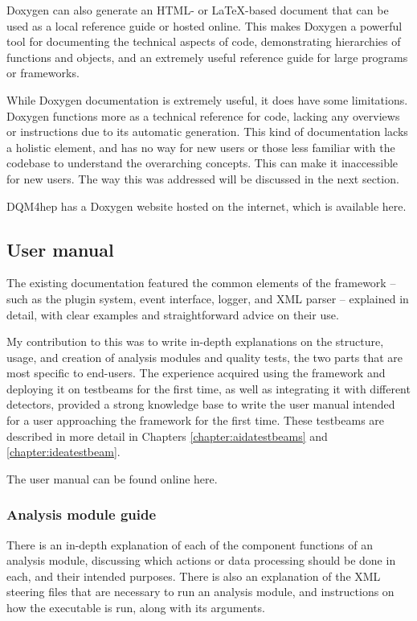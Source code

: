 Doxygen can also generate an HTML- or \LaTeX -based document that can be used as a local reference guide or hosted online. This makes Doxygen a powerful tool for documenting the technical aspects of code, demonstrating hierarchies of functions and objects, and an extremely useful reference guide for large programs or frameworks.

While Doxygen documentation is extremely useful, it does have some limitations. Doxygen functions more as a technical reference for code, lacking any overviews or instructions due to its automatic generation. This kind of documentation lacks a holistic element, and has no way for new users or those less familiar with the codebase to understand the overarching concepts. This can make it inaccessible for new users. The way this was addressed will be discussed in the next section.

DQM4hep has a Doxygen website hosted on the internet, which is available here\cite{dqm4hep-doxygen}.

\subsection{User manual} 
The existing documentation featured the common elements of the framework -- such as the plugin system, event interface, logger, and XML parser -- explained in detail, with clear examples and straightforward advice on their use.

My contribution to this was to write in-depth explanations on the structure, usage, and creation of analysis modules and quality tests, the two parts that are most specific to end-users. The experience acquired using the framework and deploying it on testbeams for the first time, as well as integrating it with different detectors, provided a strong knowledge base to write the user manual intended for a user approaching the framework for the first time. These testbeams are described in more detail in Chapters \ref{chapter:aidatestbeams} and \ref{chapter:ideatestbeam}.

The user manual can be found online here\cite{dqm4hep-user-manual}.

\subsubsection*{Analysis module guide}
There is an in-depth explanation of each of the component functions of an analysis module, discussing which actions or data processing should be done in each, and their intended purposes. There is also an explanation of the \acrshort{XML} steering files that are necessary to run an analysis module, and instructions on how the executable is run, along with its arguments.

